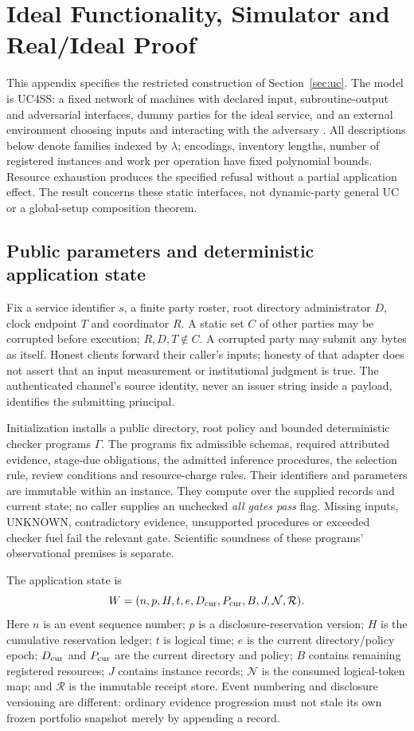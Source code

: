 \section{Ideal Functionality, Simulator and Real/Ideal Proof}
\label{app:uc}
This appendix specifies the restricted construction of Section~\ref{sec:uc}.
The model is UC4SS: a fixed network of machines with declared input,
subroutine-output and adversarial interfaces, dummy parties for the ideal
service, and an external environment choosing inputs and interacting with
the adversary \citep{canetti2025uc}. All descriptions below denote
families indexed by $\lambda$; encodings, inventory lengths, number of
registered instances and work per operation have fixed polynomial bounds.
Resource exhaustion produces the specified refusal without a partial
application effect. The result concerns these static interfaces, not
dynamic-party general UC or a global-setup composition theorem.

\subsection{Public parameters and deterministic application state}
\label{app:uc-kernel}
Fix a service identifier $s$, a finite party roster, root directory
administrator $D$, clock endpoint $T$ and coordinator $R$.
A static set $C$ of other parties may be corrupted before execution;
$R,D,T\notin C$. A corrupted party may submit any bytes as itself.
Honest clients forward their caller's inputs; honesty of that adapter
does not assert that an input measurement or institutional judgment is true.
The authenticated channel's source identity, never an issuer string
inside a payload, identifies the submitting principal.

Initialization installs a public directory, root policy and bounded
deterministic checker programs $\Gamma$.
The programs fix admissible schemas, required attributed evidence,
stage-due obligations, the admitted inference procedures, the selection
rule, review conditions and resource-charge rules. Their identifiers
and parameters are immutable within an instance. They compute over the
supplied records and current state; no caller supplies an unchecked
\emph{all gates pass} flag. Missing inputs, UNKNOWN, contradictory evidence,
unsupported procedures or exceeded checker fuel fail the relevant gate.
Scientific soundness of these programs' observational premises is separate.

The application state is
\[
 W=(n,p,H,t,e,D_{\rm cur},P_{\rm cur},B,J,\mathcal N,\mathcal R).
\]
Here $n$ is an event sequence number; $p$ is a disclosure-reservation version;
$H$ is the cumulative reservation ledger; $t$ is logical time; $e$ is the
current directory/policy epoch; $D_{\rm cur}$ and $P_{\rm cur}$ are the
current directory and policy;
$B$ contains remaining registered resources; $J$ contains instance records;
$\mathcal N$ is the consumed logical-token map; and $\mathcal R$ is the
immutable receipt store. Event numbering and disclosure versioning are
different: ordinary evidence progression must not stale its own frozen
portfolio snapshot merely by appending a record.

